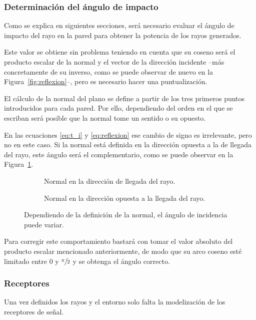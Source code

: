 \subsubsection*{Determinación del ángulo de impacto}

Como se explica en siguientes secciones, será necesario evaluar el ángulo de impacto del rayo en la pared para obtener la potencia de los rayos generados.

Este valor se obtiene sin problema teniendo en cuenta que su coseno será el producto escalar de la normal y el vector de la dirección incidente --más concretamente de su inverso, como se puede observar de nuevo en la Figura~\ref{fig:reflexion}--, pero es necesario hacer una puntualización.

El cálculo de la normal del plano se define a partir de los tres primeros puntos introducidos para cada pared.
Por ello, dependiendo del orden en el que se escriban será posible que la normal tome un sentido o su opuesto.

En las ecuaciones \eqref{eq:t_i} y \eqref{eq:reflexion} ese cambio de signo es irrelevante, pero no en este caso.
Si la normal está definida en la dirección opuesta a la de llegada del rayo, este ángulo será el complementario, como se puede observar en la Figura~\ref{fig:angulo_incidencia}.
\begin{figure}[H]
    \centering
    \begin{subfigure}[b]{0.4\textwidth}
        \centering
        
        \caption{Normal en la dirección de llegada del rayo.}
    \end{subfigure}
    \hspace*{10pt}
    \begin{subfigure}[b]{0.4\textwidth}
        \centering
        
        \caption{Normal en la dirección opuesta a la llegada del rayo.}
    \end{subfigure}
    \caption{Dependiendo de la definición de la normal, el ángulo de incidencia puede variar.}
    \label{fig:angulo_incidencia}
\end{figure}

Para corregir este comportamiento bastará con tomar el valor absoluto del producto escalar mencionado anteriormente, de modo que su arco coseno esté limitado entre 0 y $\sfrac{\pi}{2}$ y se obtenga el ángulo correcto.

\subsubsection{Receptores}
Una vez definidos los rayos y el entorno solo falta la modelización de los receptores de señal.

